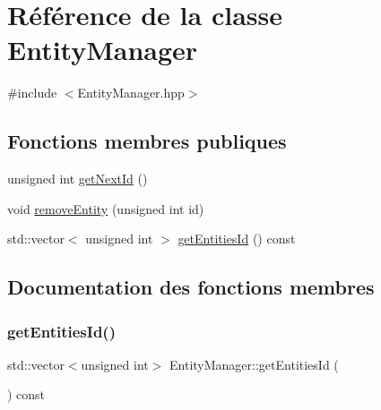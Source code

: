 \hypertarget{classEntityManager}{}\section{Référence de la classe Entity\+Manager}
\label{classEntityManager}


{\ttfamily \#include $<$Entity\+Manager.\+hpp$>$}

\subsection*{Fonctions membres publiques}
\begin{DoxyCompactItemize}
\item 
unsigned int \hyperlink{classEntityManager_a05b583588490e76e947c5cf8a986b5f7}{get\+Next\+Id} ()
\item 
void \hyperlink{classEntityManager_a2020094cd37ee4d48320c48c030b7053}{remove\+Entity} (unsigned int id)
\item 
std\+::vector$<$ unsigned int $>$ \hyperlink{classEntityManager_a9ea2833e8104a1cc41ba2760148f6d5a}{get\+Entities\+Id} () const
\end{DoxyCompactItemize}


\subsection{Documentation des fonctions membres}
\mbox{\label{classEntityManager_a9ea2833e8104a1cc41ba2760148f6d5a}} 
\subsubsection{\texorpdfstring{get\+Entities\+Id()}{getEntitiesId()}}
{\footnotesize\ttfamily std\+::vector$<$unsigned int$>$ Entity\+Manager\+::get\+Entities\+Id (\begin{DoxyParamCaption}{ }\end{DoxyParamCaption}) const\hspace{0.3cm}{\ttfamily [inline]}}

\mbox{\label{classEntityManager_a05b583588490e76e947c5cf8a986b5f7}} 
